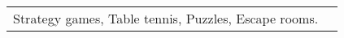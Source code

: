 \begin{tabularx}{\linewidth}{@{}l X@{}}
    Strategy games, Table tennis, Puzzles, Escape rooms.
\end{tabularx}